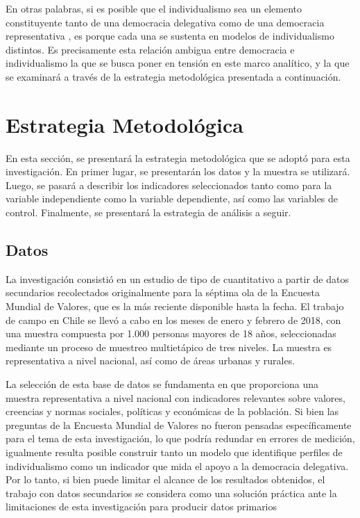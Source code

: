 \documentclass[12pt,twoside]{templates/facsothesis}
\begin{document}
En otras palabras, si es posible que el individualismo sea un elemento constituyente tanto de una democracia delegativa \citep{odonnell1994} como de una democracia representativa \citep{martuccelli2010}, es porque cada una se sustenta en modelos de individualismo distintos. Es precisamente esta relación ambigua entre democracia e individualismo la que se busca poner en tensión en este marco analítico, y la que se examinará a través de la estrategia metodológica presentada a continuación.

\hypertarget{estrategia-metodoluxf3gica}{%
\chapter{Estrategia Metodológica}\label{estrategia-metodoluxf3gica}}

En esta sección, se presentará la estrategia metodológica que se adoptó para esta investigación. En primer lugar, se presentarán los datos y la muestra se utilizará. Luego, se pasará a describir los indicadores seleccionados tanto como para la variable independiente como la variable dependiente, así como las variables de control. Finalmente, se presentará la estrategia de análisis a seguir.

\hypertarget{datos}{%
\section{Datos}\label{datos}}

La investigación consistió en un estudio de tipo de cuantitativo a partir de datos secundarios recolectados originalmente para la séptima ola de la Encuesta Mundial de Valores, que es la más reciente disponible hasta la fecha. El trabajo de campo en Chile se llevó a cabo en los meses de enero y febrero de 2018, con una muestra compuesta por 1.000 personas mayores de 18 años, seleccionadas mediante un proceso de muestreo multietápico de tres niveles. La muestra es representativa a nivel nacional, así como de áreas urbanas y rurales.

La selección de esta base de datos se fundamenta en que proporciona una muestra representativa a nivel nacional con indicadores relevantes sobre valores, creencias y normas sociales, políticas y económicas de la población. Si bien las preguntas de la Encuesta Mundial de Valores no fueron pensadas específicamente para el tema de esta investigación, lo que podría redundar en errores de medición, igualmente resulta posible construir tanto un modelo que identifique perfiles de individualismo como un indicador que mida el apoyo a la democracia delegativa. Por lo tanto, si bien puede limitar el alcance de los resultados obtenidos, el trabajo con datos secundarios se considera como una solución práctica ante la limitaciones de esta investigación para producir datos primarios
\end{document}

